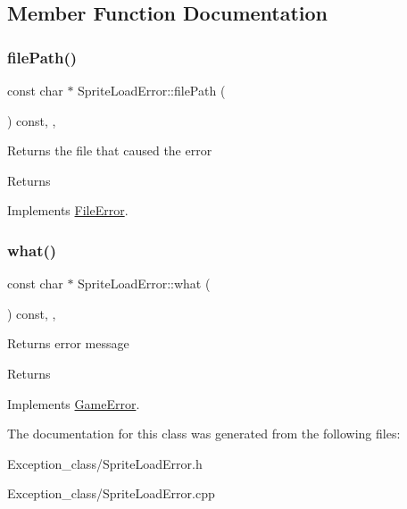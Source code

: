\subsection{Member Function Documentation}
\mbox{\label{classSpriteLoadError_aa6c6ca97b781b8045eb4271aad6aa6d1}} 
\subsubsection{\texorpdfstring{file\+Path()}{filePath()}}
{\footnotesize\ttfamily const char $\ast$ Sprite\+Load\+Error\+::file\+Path (\begin{DoxyParamCaption}{ }\end{DoxyParamCaption}) const\hspace{0.3cm}{\ttfamily [override]}, {\ttfamily [virtual]}, {\ttfamily [noexcept]}}

Returns the file that caused the error \begin{DoxyReturn}{Returns}

\end{DoxyReturn}


Implements \hyperlink{classFileError_a40918f5dda2ee7063bba81d286392cdd}{File\+Error}.

\mbox{\label{classSpriteLoadError_a7b51c2ea656c91b352514cd77aab0a38}} 
\subsubsection{\texorpdfstring{what()}{what()}}
{\footnotesize\ttfamily const char $\ast$ Sprite\+Load\+Error\+::what (\begin{DoxyParamCaption}{ }\end{DoxyParamCaption}) const\hspace{0.3cm}{\ttfamily [override]}, {\ttfamily [virtual]}, {\ttfamily [noexcept]}}

Returns error message \begin{DoxyReturn}{Returns}

\end{DoxyReturn}


Implements \hyperlink{classGameError_afbe93d6a2023f2824be2733aff9e86cb}{Game\+Error}.



The documentation for this class was generated from the following files\+:\begin{DoxyCompactItemize}
\item 
Exception\+\_\+class/Sprite\+Load\+Error.\+h\item 
Exception\+\_\+class/Sprite\+Load\+Error.\+cpp\end{DoxyCompactItemize}
